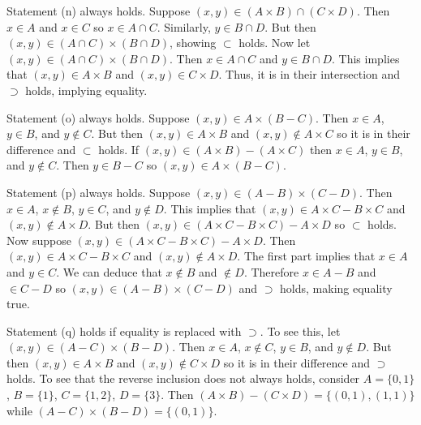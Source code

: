 \documentclass[../../master.tex]{subfiles}
\begin{document}
\begin{solution}
    Statement (n) always holds.
    Suppose $(x, y) \in (A \times B) \cap (C \times D)$.
    Then $x \in A$ and $x \in C$ so $x \in A \cap C$.
    Similarly,  $y \in B \cap D$.
    But then $(x, y) \in (A \cap C) \times (B \cap D)$, showing $\subset$ holds.
    Now let $(x, y) \in (A \cap C) \times (B \cap D)$.
    Then $x \in A \cap C$ and $y \in B \cap D$.
    This implies that $(x, y) \in A \times B$ and $(x, y) \in C \times D$.
    Thus, it is in their intersection and $\supset$ holds, implying equality.

    Statement (o) always holds.
    Suppose $(x, y) \in A \times (B - C)$. 
    Then $x \in A$, $y \in B$, and $y \notin C$.
    But then $(x, y) \in A \times B$ and $(x, y) \notin A \times C$ so it is in their difference and $\subset$ holds.
    If $(x, y) \in (A \times B) - (A \times C)$ then $x \in A$, $y \in B$, and $y \notin C$.
    Then $y \in B - C$ so $(x, y) \in A \times (B - C)$.

    Statement (p) always holds.
    Suppose $(x, y) \in (A - B) \times (C - D)$.
    Then $x \in A$, $x \notin B$, $y \in C$, and $y \notin D$.
    This implies that $(x, y) \in A \times C - B \times C$ and $(x, y) \notin A \times D$.
    But then $(x, y) \in (A \times C - B \times C) - A \times D$ so $\subset$ holds.
    Now suppose $(x, y) \in (A \times C - B \times C) - A \times D$.
    Then $(x, y) \in A \times C - B \times C$ and $(x, y) \notin A \times D$.
    The first part implies that $x \in A$ and $y \in C$. 
    We can deduce that $x \notin B$ and $\notin D$.
    Therefore $x \in A - B$ and $ \in C - D$ so $(x, y) \in (A - B) \times (C - D)$ and $\supset$ holds, making equality true.

    Statement (q) holds if equality is replaced with $\supset$.
    To see this, let $(x, y) \in (A - C) \times (B - D)$.
    Then $x \in A$, $x \notin C$, $y \in B$, and $y \notin D$.
    But then $(x, y) \in A \times B$ and $(x, y) \notin C \times D$ so it is in their difference and $\supset$ holds.
    To see that the reverse inclusion does not always holds, consider $A = \{0, 1\}$, $B = \{1\}$, $C = \{1, 2\}$, $D = \{3\}$.
    Then $(A \times B) - (C \times D) = \{(0, 1), (1, 1)\}$ while $(A - C) \times (B - D) = \{(0, 1)\}$.
\end{solution}
\end{document}
